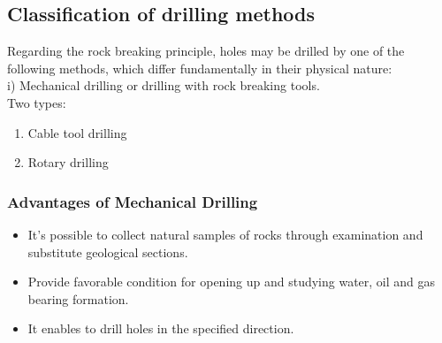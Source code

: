 \documentclass{article}
\begin{document}
\begin{multicols}{2}
  \subsection*{Classification of drilling methods}
  Regarding the rock breaking principle, holes may be drilled by one of the following methods, which differ fundamentally in their physical nature:\\
  
  i) Mechanical drilling or drilling with rock breaking tools.\\

  Two types:\\
  \begin{enumerate}
    \item Cable tool drilling 
    \item Rotary drilling
  \end{enumerate}

  \subsubsection*{Advantages of Mechanical Drilling}
  \begin{itemize}
    \item It's possible to collect natural samples of rocks through examination and substitute geological sections.
    \item Provide favorable condition for opening up and studying water, oil and gas bearing formation.
    \item It enables to drill holes in the specified direction.
  \end{itemize}

\end{multicols}
\end{document}
